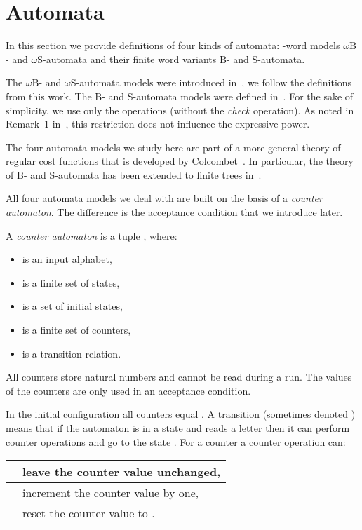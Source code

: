 \documentclass{LMCS}
\newcommand{\wB}{\ensuremath{\omega \mathrm{B}}\xspace}
\newcommand{\wS}{\ensuremath{\omega \mathrm{S}}\xspace}
\newcommand{\fB}{\ensuremath{\mathrm{B}}\xspace}
\newcommand{\fS}{\ensuremath{\mathrm{S}}\xspace}
\begin{document}
\section{Automata}\label{s:automata}

In this section we provide definitions of four kinds of automata: -word models \wB- and \wS-automata and their finite word variants \fB- and \fS-automata. 

The \wB- and \wS-automata models were introduced in~\cite{bojanczyk_bounds}, we follow the definitions from this work. The \fB- and \fS-automata models were defined in~\cite{colcombet_stabilisation}. For the sake of simplicity, we use only the operations  (without the \emph{check} operation). As noted in Remark~1 in~\cite{colcombet_stabilisation}, this restriction does not influence the expressive power. 

The four automata models we study here are part of a more general theory of regular cost functions that is developed by Colcombet~\cite{colcombet_stabilisation, colcombet_hab}. In particular, the theory of \fB- and \fS-automata has been extended to finite trees in~\cite{colcombet_cost_trees}.

All four automata models we deal with are built on the basis of a \emph{counter automaton}. The difference is the acceptance condition that we introduce later.

\begin{definition}
A \emph{counter automaton} is a tuple , where:
\begin{itemize}
\item  is an input alphabet,
\item  is a finite set of states,
\item  is a set of initial states,
\item  is a finite set of counters,
\item  is a transition relation.
\end{itemize}
\end{definition}

All counters store natural numbers and cannot be read during a run. The values of the counters are only used in an acceptance condition.

In the initial configuration all counters equal . A transition  (sometimes denoted ) means that if the automaton is in a state  and reads a letter  then it can perform counter operations  and go to the state . For a counter  a counter operation  can:

\vspace{0.2cm}
\begin{tabular}{ l | l }
 & leave the counter value unchanged, \\
\hline
 & increment the counter value by one, \\
\hline
 & reset the counter value to .
\end{tabular}
\vspace{0.5cm}
\end{document}
